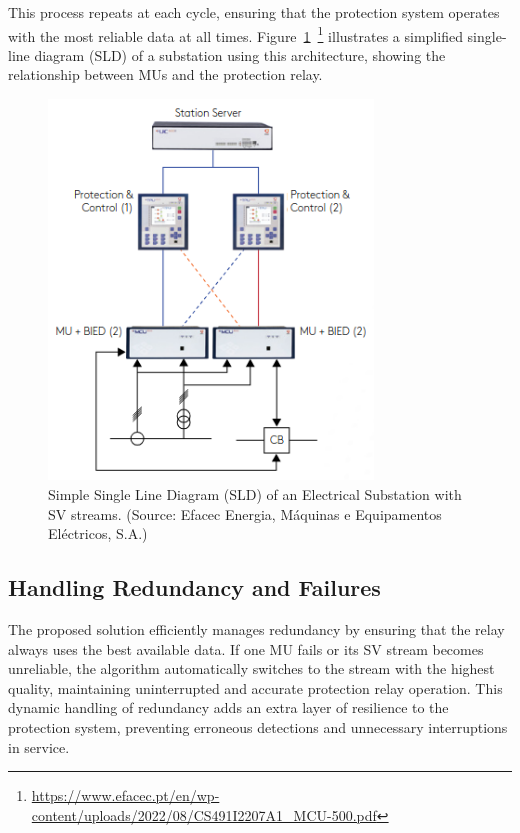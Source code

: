 This process repeats at each cycle, ensuring that the protection system operates with the most reliable data at all times. Figure~\ref{fig:SLD_Diagram}~\footnote{\url{https://www.efacec.pt/en/wp-content/uploads/2022/08/CS491I2207A1_MCU-500.pdf}} illustrates a simplified single-line diagram (SLD) of a substation using this architecture, showing the relationship between MUs and the protection relay.

\begin{figure}[tbh!]
	\centering
	\includegraphics[width=0.77\textwidth, keepaspectratio]{ch3/assets/SLD_Diagram.png}
	\caption{Simple Single Line Diagram (SLD) of an Electrical Substation with SV streams. (Source: Efacec Energia, Máquinas e Equipamentos Eléctricos, S.A.)}
	\label{fig:SLD_Diagram}
\end{figure}

\subsection{Handling Redundancy and Failures}

The proposed solution efficiently manages redundancy by ensuring that the relay always uses the best available data. If one MU fails or its SV stream becomes unreliable, the algorithm automatically switches to the stream with the highest quality, maintaining uninterrupted and accurate protection relay operation. This dynamic handling of redundancy adds an extra layer of resilience to the protection system, preventing erroneous detections and unnecessary interruptions in service.

